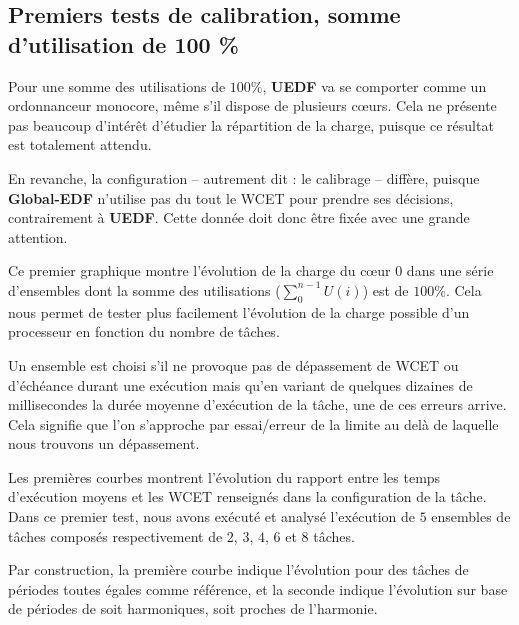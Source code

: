 \subsection{Premiers tests de calibration, somme d'utilisation de 100 \%}

Pour une somme des utilisations de $100\%$, \textbf{UEDF} va se comporter comme un ordonnanceur 
monocore, même s'il dispose de plusieurs cœurs. Cela ne présente pas beaucoup d'intérêt d'étudier la 
répartition de la charge, puisque ce résultat est totalement attendu.\newline

En revanche, la configuration -- autrement dit : le calibrage -- diffère, puisque 
\textbf{Global-EDF} n'utilise pas du tout le WCET pour prendre ses décisions, contrairement 
à \textbf{UEDF}. Cette donnée doit donc être fixée avec une grande attention.\newline

Ce premier graphique montre l'évolution de la charge du cœur $0$ dans une série d'ensembles dont la 
somme des utilisations ($\sum_0^{n-1}U(i)$) est de $100\%$.
Cela nous permet de tester plus facilement l'évolution de la charge possible d'un processeur en fonction du nombre de tâches.\newline

Un ensemble est choisi s'il ne provoque pas de dépassement de WCET ou d'échéance durant une exécution 
mais qu'en variant de quelques dizaines de millisecondes la durée moyenne d'exécution de la tâche, une de ces erreurs arrive. 
Cela signifie que l'on s'approche par essai/erreur de la limite au delà de laquelle nous trouvons un dépassement.\newline

Les premières courbes montrent l'évolution du rapport entre les temps d'exécution moyens et les WCET renseignés dans la 
configuration de la tâche. 
Dans ce premier test, nous avons exécuté et analysé l'exécution de $5$ ensembles de tâches composés respectivement de 
$2$, $3$, $4$, $6$ et $8$ tâches.\newline 

Par construction, la première courbe indique l'évolution pour des tâches de périodes toutes égales comme référence, 
et la seconde indique l'évolution sur base de périodes de soit harmoniques, soit proches de l'harmonie.\newline


